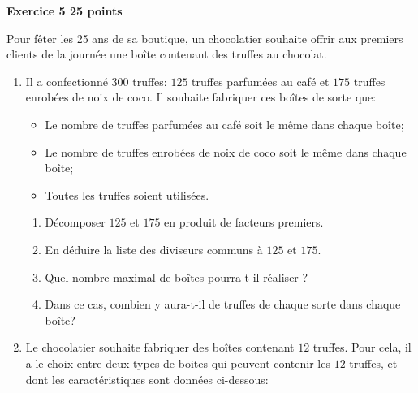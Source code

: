 \documentclass[11pt]{article}
\begin{document}
\textbf{Exercice 5 \hfill 25 points}

\medskip

Pour fêter les 25 ans de sa boutique, un chocolatier souhaite offrir aux premiers clients de la journée une boîte contenant des truffes au chocolat.

\medskip

\begin{enumerate}
\item Il a confectionné $300$ truffes: $125$ truffes parfumées au café et $175$ truffes enrobées de noix de coco. Il souhaite fabriquer ces boîtes de sorte que:

\setlength\parindent{1cm}
\begin{itemize}
\item[$\bullet~~$] Le nombre de truffes parfumées au café soit le même dans chaque boîte;
\item[$\bullet~~$] Le nombre de truffes enrobées de noix de coco soit le même dans chaque boîte;
\item[$\bullet~~$] Toutes les truffes soient utilisées.
\end{itemize}
\setlength\parindent{0cm}

	\begin{enumerate}
		\item Décomposer $125$ et $175$ en produit de facteurs premiers.
		\item En déduire la liste des diviseurs communs à $125$ et $175$.
		\item Quel nombre maximal de boîtes pourra-t-il réaliser ?
		\item Dans ce cas, combien y aura-t-il de truffes de chaque sorte dans chaque boîte?
	\end{enumerate}	
\item Le chocolatier souhaite fabriquer des boîtes contenant $12$ truffes. Pour cela, il a le choix entre deux types de boites qui peuvent contenir les $12$ truffes, et dont les caractéristiques sont données ci-dessous:


\end{enumerate}
\end{document}
